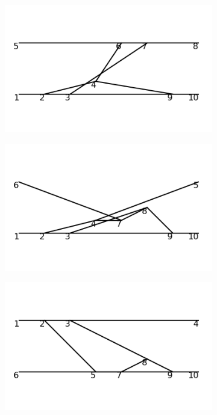 \documentclass[11pt,a4paper,twoside,pdf]{article}
\numberwithin{equation}{section}
\begin{document}
\begin{figure}[h!]
\begin{subfigure}[t]{0.16\textwidth}
    \end{subfigure}
    \hfill
    \begin{subfigure}[t]{0.16\textwidth}
        \centering
        \includegraphics[width=\textwidth]{plots/order6_2to2/18.png}
    \end{subfigure}
    \hfill
    \begin{subfigure}[t]{0.16\textwidth}
        \centering
        \includegraphics[width=\textwidth]{plots/order6_2to2/19.png}
    \end{subfigure}
    \hfill
    \begin{subfigure}[t]{0.16\textwidth}
        \centering
        \includegraphics[width=\textwidth]{plots/order6_2to2/20.png}

\end{subfigure}
\end{figure}
\end{document}
